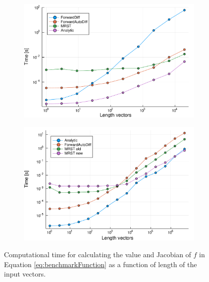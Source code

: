 \begin{figure}[H]
    \centering
    \begin{subfigure}[t]{0.48\textwidth}
        \centering
        \includegraphics[width = \textwidth]{figures/benchmark_all_ADs.pdf}
        \caption{}
        \label{fig:benchmarkAllADs}
    \end{subfigure}
    \begin{subfigure}[t]{0.49\textwidth}
        \centering
        \includegraphics[width = \textwidth]{figures/benchmark_long_vectors_4.pdf}
        \caption{}
        \label{fig:benchmarkLongVectors}
    \end{subfigure}
    \caption{Computational time for calculating the value and Jacobian of $f$ in Equation \eqref{eq:benchmarkFunction} as a function of length of the input vectors.}
    \label{fig:benchmarkAD}
\end{figure}

